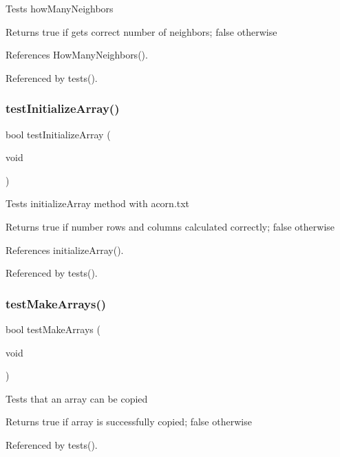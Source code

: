 Tests how\+Many\+Neighbors \begin{DoxyReturn}{Returns}
true if gets correct number of neighbors; false otherwise 
\end{DoxyReturn}


References How\+Many\+Neighbors().



Referenced by tests().

\mbox{\label{tests_8h_a923315476fce6d67e320586093081ded}} 
\subsubsection{test\+Initialize\+Array()}
{\footnotesize\ttfamily bool test\+Initialize\+Array (\begin{DoxyParamCaption}\item[{void}]{ }\end{DoxyParamCaption})}

Tests initialize\+Array method with acorn.\+txt \begin{DoxyReturn}{Returns}
true if number rows and columns calculated correctly; false otherwise 
\end{DoxyReturn}


References initialize\+Array().



Referenced by tests().

\mbox{\label{tests_8h_af6e338851f3ccb4714e1bfb06ec4b428}} 
\subsubsection{test\+Make\+Arrays()}
{\footnotesize\ttfamily bool test\+Make\+Arrays (\begin{DoxyParamCaption}\item[{void}]{ }\end{DoxyParamCaption})}

Tests that an array can be copied \begin{DoxyReturn}{Returns}
true if array is successfully copied; false otherwise 
\end{DoxyReturn}


Referenced by tests().

\mbox{\label{tests_8h_a030c56f9df10719a01799a53880587bd}} 
